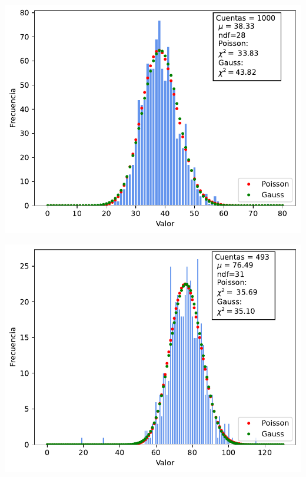 \documentclass[11pt]{article}
\begin{document}
\begin{minipage}[t]{0.5\linewidth}
\begin{center}
		 \label{Fig:5s}
		\includegraphics[width=1\linewidth]{../Graficas/Histo_5s.pdf}
\end{center}
\end{minipage}	
\hfill
\begin{minipage}[t]{0.5\linewidth}
\begin{center}
		 \label{Fig:10s}
		\includegraphics[width=1\linewidth]{../Graficas/Histo_10s.pdf}
\end{center}
\end{minipage}	
\end{document}
